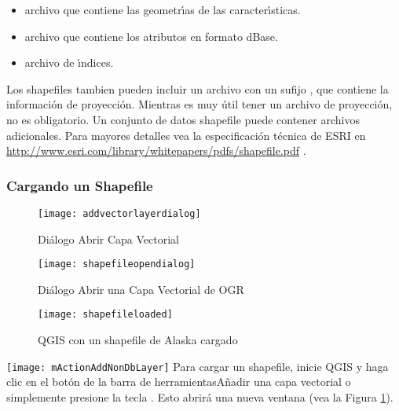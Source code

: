 \begin{itemize}
\item {} archivo que contiene las geometr\'{\i}as de las caracter\'{\i}sticas.
\item {} archivo que contiene los atributos en formato dBase.
\item {} archivo de \'{\i}ndices.
\end{itemize}

Los shapefiles tambien pueden incluir un archivo con un sufijo , que contiene la informaci\'on de proyecci\'on. Mientras es muy \'util tener un archivo de proyecci\'on, no es obligatorio. Un conjunto de datos shapefile puede contener archivos adicionales. Para mayores detalles vea la especificaci\'on t\'ecnica de ESRI en  \url{http://www.esri.com/library/whitepapers/pdfs/shapefile.pdf}
.

\subsubsection{Cargando un Shapefile}\label{sec:load_shapefile}

\begin{figure}[ht]
   \begin{center}
   \caption{Di\'alogo Abrir Capa Vectorial \nixcaption}\label{fig:addvectorlayer}\smallskip
   \texttt{[image: addvectorlayerdialog]}
\end{center} 
\end{figure}

\begin{figure}[ht]
   \begin{center}
   \caption{Di\'alogo Abrir una Capa Vectorial de OGR \nixcaption}\label{fig:openshapefile}\smallskip
   \texttt{[image: shapefileopendialog]}
\end{center} 
\end{figure}

\begin{figure}[ht]
   \begin{center}
   \caption{QGIS con un shapefile de Alaska cargado \nixcaption}\label{fig:loadedshapefile}\smallskip
   \texttt{[image: shapefileloaded]}
\end{center} 
\end{figure}

\texttt{[image: mActionAddNonDbLayer]} Para cargar un shapefile, inicie
QGIS y haga clic en el bot\'on  de la barra de herramientas{A\~nadir una capa vectorial}
 o simplemente presione la tecla . Esto abrir\'a una nueva ventana (vea la Figura \ref{fig:addvectorlayer}).  

